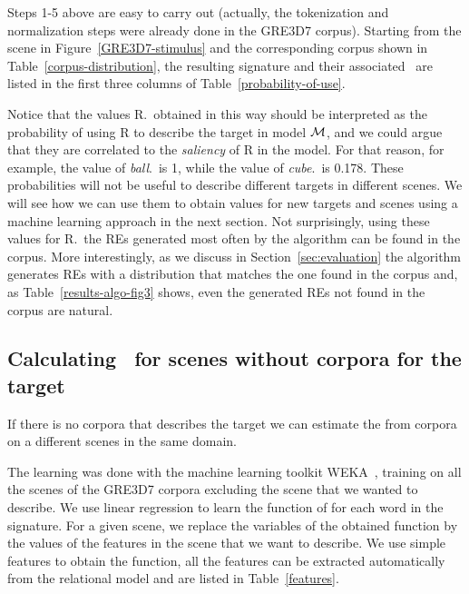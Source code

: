 Steps 1-5 above are easy to carry out (actually, the tokenization and normalization steps were already done in the GRE3D7 corpus). Starting from the scene in Figure~\ref{GRE3D7-stimulus} and the corresponding corpus shown in Table~\ref{corpus-distribution}, the resulting signature and their associated \puse\ are listed in the first three columns of Table~\ref{probability-of-use}. 

Notice that the values R.\puse\ obtained in this way should be interpreted as the probability of using R to describe the target in model $\mathcal{M}$, and we could argue that they are correlated to the \emph{saliency} of R in the model.  
For that reason, for example, the value of \emph{ball}.\puse\ is 1, while the value of \emph{cube}.\puse\ is 0.178.  These probabilities will not be useful to describe different targets in different scenes.  We will see how we can use them to obtain values for new targets and scenes using a machine learning approach in the next section.  Not surprisingly, using these values for R.\puse\ the REs generated most often by the algorithm can be found in the corpus.  More interestingly, as we discuss in Section~\ref{sec:evaluation} the algorithm generates REs with a distribution that matches the one found in the corpus and, as Table~\ref{results-algo-fig3} shows, even the generated REs not found in the corpus are natural.    


\subsection{Calculating \puse\ for scenes without corpora for the target} \label{subsec:learning}

If there is no corpora that describes the target we can estimate the \puse from corpora on a different scenes in the same domain. 


The learning was done with the machine learning toolkit WEKA~\cite{Hall:WEK09}, training on all the scenes of the GRE3D7 corpora excluding the scene that we wanted  to describe. We use linear regression to learn the function of \puse for each word in the signature. For a given scene, we replace the variables of the obtained function by the values of the features in the scene that we want to describe. We use simple features to obtain the function, all the features can be extracted automatically from the relational model and are listed in Table~\ref{features}.  

